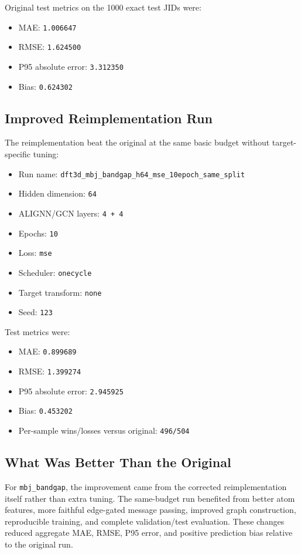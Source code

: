 \documentclass[11pt]{article}
\begin{document}
Original test metrics on the 1000 exact test JIDs were:
\begin{itemize}
  \item MAE: \texttt{1.006647}
  \item RMSE: \texttt{1.624500}
  \item P95 absolute error: \texttt{3.312350}
  \item Bias: \texttt{0.624302}
\end{itemize}

\subsection{Improved Reimplementation Run}

The reimplementation beat the original at the same basic budget without target-specific tuning:
\begin{itemize}
  \item Run name: \texttt{dft3d\_mbj\_bandgap\_h64\_mse\_10epoch\_same\_split}
  \item Hidden dimension: \texttt{64}
  \item ALIGNN/GCN layers: \texttt{4 + 4}
  \item Epochs: \texttt{10}
  \item Loss: \texttt{mse}
  \item Scheduler: \texttt{onecycle}
  \item Target transform: \texttt{none}
  \item Seed: \texttt{123}
\end{itemize}

Test metrics were:
\begin{itemize}
  \item MAE: \texttt{0.899689}
  \item RMSE: \texttt{1.399274}
  \item P95 absolute error: \texttt{2.945925}
  \item Bias: \texttt{0.453202}
  \item Per-sample wins/losses versus original: \texttt{496/504}
\end{itemize}

\subsection{What Was Better Than the Original}

For \texttt{mbj\_bandgap}, the improvement came from the corrected reimplementation itself rather than extra tuning.  The same-budget run benefited from better atom features, more faithful edge-gated message passing, improved graph construction, reproducible training, and complete validation/test evaluation.  These changes reduced aggregate MAE, RMSE, P95 error, and positive prediction bias relative to the original run.
\end{document}
